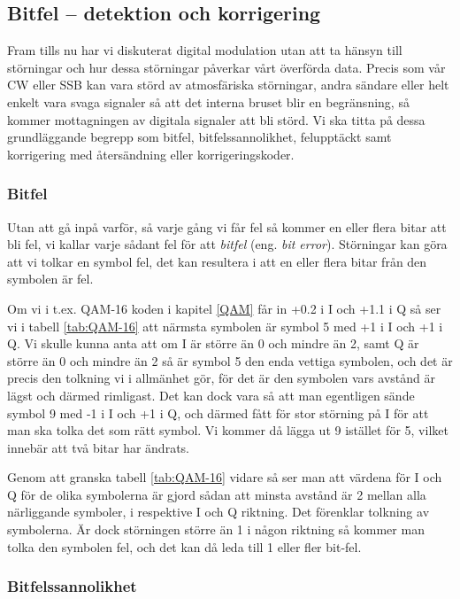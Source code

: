 \subsection{Bitfel -- detektion och korrigering}

Fram tills nu har vi diskuterat digital modulation utan att ta hänsyn till
störningar och hur dessa störningar påverkar vårt överförda data. Precis som
vår CW eller SSB kan vara störd av atmosfäriska störningar, andra sändare
eller helt enkelt vara svaga signaler så att det interna bruset blir en
begränsning, så kommer mottagningen av digitala signaler att bli störd.
Vi ska titta på dessa grundläggande begrepp som bitfel, bitfelssannolikhet,
felupptäckt samt korrigering med återsändning eller korrigeringskoder.

\subsubsection{Bitfel}

Utan att gå inpå varför, så varje gång vi får fel så kommer en eller flera
bitar att bli fel, vi kallar varje sådant fel för att \emph{bitfel} (eng.
\emph{bit error}). Störningar kan göra att vi tolkar en symbol fel, det kan
resultera i att en eller flera bitar från den symbolen är fel.

Om vi i t.ex. QAM-16 koden i kapitel \ref{QAM} får in +0.2 i I och +1.1 i Q
så ser vi i tabell \ref{tab:QAM-16} att närmsta symbolen är symbol 5 med +1 i I
och +1 i Q. Vi skulle kunna anta att om I är större än 0 och mindre än 2, samt
Q är större än 0 och mindre än 2 så är symbol 5 den enda vettiga symbolen, och
det är precis den tolkning vi i allmänhet gör, för det är den symbolen vars
avstånd är lägst och därmed rimligast. Det kan dock vara så att man egentligen
sände symbol 9 med -1 i I och +1 i Q, och därmed fått för stor störning på I
för att man ska tolka det som rätt symbol. Vi kommer då lägga ut 9 istället
för 5, vilket innebär att två bitar har ändrats.

Genom att granska tabell \ref{tab:QAM-16} vidare så ser man att värdena för
I och Q för de olika symbolerna är gjord sådan att minsta avstånd är 2 mellan
alla närliggande symboler, i respektive I och Q riktning. Det förenklar
tolkning av symbolerna. Är dock störningen större än 1 i någon riktning så
kommer man tolka den symbolen fel, och det kan då leda till 1 eller fler
bit-fel.

\subsubsection{Bitfelssannolikhet}

